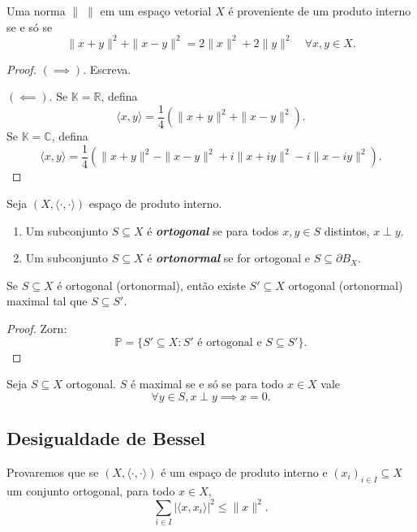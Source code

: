 \documentclass[portuguese]{article}
\theoremstyle{definition}
\newcommand{\R}{\mathbb{R}}
\newcommand{\C}{\mathbb{C}}
\begin{document}
\begin{teo}
	Uma norma $\|\;\|$ em um espaço vetorial $X$ é proveniente de um produto interno se e só se
	\[\|x+y\|^2+\|x-y\|^2=2\|x\|^2+2\|y\|^2\quad\forall x,y\in X.\]
\end{teo}
\begin{proof}
	$(\implies)$. Escreva.
	
	$(\impliedby)$. Se $\mathbb{K}=\R$, defina
	\[\langle x,y\rangle=\frac{1}{4}\left(\|x+y\|^2+\|x-y\|^2\right).\]
	Se $\mathbb{K}=\C$, defina
	\[\langle x,y\rangle=\frac{1}{4}\left(\|x+y\|^2-\|x-y\|^2+i\|x+iy\|^2-i\|x-iy\|^2\right).\]
\end{proof}
\begin{defn}
	Seja $(X,\langle\cdot,\cdot\rangle)$ espaço de produto interno.
	\begin{enumerate}
		\item Um subconjunto $S\subseteq X$ é \textbf{\textit{ortogonal}} se para todos $x,y\in S$ distintos, $x\perp y$.
		\item Um subconjunto $S\subseteq X$ é \textbf{\textit{ortonormal}} se for ortogonal e $S\subseteq\partial B_X$.
	\end{enumerate}
\end{defn}
\begin{prop}
	Se $S\subseteq X$ é ortogonal (ortonormal), então existe $S'\subseteq X$ ortogonal (ortonormal) maximal tal que $S\subseteq S'$.
\end{prop}
\begin{proof}
	Zorn:
	\[\mathbb{P}=\{S'\subseteq X:S'\text{ é ortogonal e }S\subseteq S'\}.\]
\end{proof}
\begin{exer*}
	Seja $S\subseteq X$ ortogonal. $S$ é maximal se e só se para todo $x\in X$ vale
	\[\forall y\in S, x\perp y\implies x=0.\]
\end{exer*}

\subsection{Desigualdade de Bessel}
Provaremos que se $(X,\langle\cdot,\cdot\rangle)$ é um espaço de produto interno e $(x_i)_{i\in I}\subseteq X$ um conjunto ortogonal, para todo $x\in X$,
	\[\sum_{i\in I}|\langle x,x_i\rangle|^2\leq\|x\|^2.\]
\end{document}
